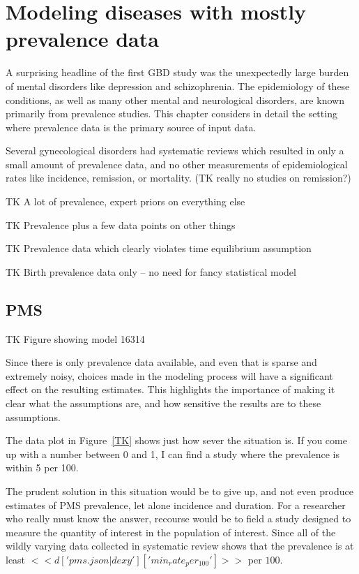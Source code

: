 \section{Modeling diseases with mostly prevalence data}

A surprising headline of the first GBD study was the unexpectedly
large burden of mental disorders like depression and
schizophrenia. The epidemiology of these conditions, as well as many
other mental and neurological disorders, are known primarily from
prevalence studies. This chapter considers in detail the setting where
prevalence data is the primary source of input data.

Several gynecological disorders had systematic reviews which resulted
in only a small amount of prevalence data, and no other measurements
of epidemiological rates like incidence, remission, or mortality.  (TK
really no studies on remission?)

TK A lot of prevalence, expert priors on everything else

TK Prevalence plus a few data points on other things

TK Prevalence data which clearly violates time equilibrium assumption

TK Birth prevalence data only – no need for fancy statistical model

\subsection{PMS}
TK Figure showing model 16314

Since there is only prevalence data available, and even that is sparse
and extremely noisy, choices made in the modeling process will have a
significant effect on the resulting estimates.  This highlights the
importance of making it clear what the assumptions are, and how
sensitive the results are to these assumptions.

The data plot in Figure~\ref{TK} shows just how sever the situation
is.  If you come up with a number between 0 and 1, I can find a study
where the prevalence is within 5 per 100.

The prudent solution in this situation would be to give up, and not
even produce estimates of PMS prevalence, let alone incidence and
duration.  For a researcher who really must know the answer, recourse
would be to field a study designed to measure the quantity of interest
in the population of interest.  Since all of the wildly varying data
collected in systematic review shows that the prevalence is at least
$<<d['pms.json|dexy']['min_rate_per_100']>>$ per $100$.

